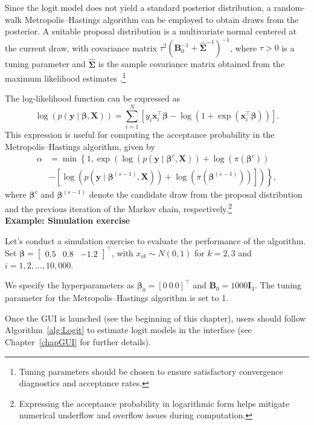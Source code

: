 Since the logit model does not yield a standard posterior distribution, a random-walk Metropolis–Hastings algorithm can be employed to obtain draws from the posterior. A suitable proposal distribution is a multivariate normal centered at the current draw, with covariance matrix 
$\tau^2({\bm{B}}_0^{-1} + \widehat{{\bm{\Sigma}}}^{-1})^{-1}$, 
where $\tau > 0$ is a tuning parameter and $\widehat{\bm{\Sigma}}$ is the sample covariance matrix obtained from the maximum likelihood estimates \cite{Martin2011}.\footnote{Tuning parameters should be chosen to ensure satisfactory convergence diagnostics and acceptance rates.}

The log-likelihood function can be expressed as
\[
\log(p({\bm{y}} \mid \bm{\beta}, {\bm{X}})) 
= \sum_{i=1}^N \left[y_i {\bm{x}}_i^{\top}\bm{\beta} - \log(1 + \exp({\bm{x}}_i^{\top}\bm{\beta}))\right].
\]
This expression is useful for computing the acceptance probability in the Metropolis–Hastings algorithm, given by
\begin{align*}
\alpha & = \min\left\{1, 
\exp\left(
\log(p({\bm{y}} \mid \bm{\beta}^{c}, {\bm{X}})) + \log(\pi(\bm{\beta}^c))\right.\right.\\
&\left.\left.
- \left[\log(p({\bm{y}} \mid \bm{\beta}^{(s-1)}, {\bm{X}})) + \log(\pi(\bm{\beta}^{(s-1)}))\right]
\right)\right\},
\end{align*}
where $\bm{\beta}^c$ and $\bm{\beta}^{(s-1)}$ denote the candidate draw from the proposal distribution and the previous iteration of the Markov chain, respectively.\footnote{Expressing the acceptance probability in logarithmic form helps mitigate numerical underflow and overflow issues during computation.}\\

\textbf{Example: Simulation exercise}

Let's conduct a simulation exercise to evaluate the performance of the algorithm. Set $\bm{\beta} = \begin{bmatrix} 0.5 & 0.8 & -1.2 \end{bmatrix}^{\top}$, with $x_{ik} \sim N(0,1)$ for $k = 2, 3$ and $i = 1, 2, \dots, 10{,}000$.

We specify the hyperparameters as $\bm{\beta}_0 = [0 \ 0 \ 0]^{\top}$ and ${\bm{B}}_0 = 1000{\bm{I}}_3$. The tuning parameter for the Metropolis–Hastings algorithm is set to 1.

Once the GUI is launched (see the beginning of this chapter), users should follow Algorithm~\ref{alg:Logit} to estimate logit models in the interface (see Chapter~\ref{chapGUI} for further details).

